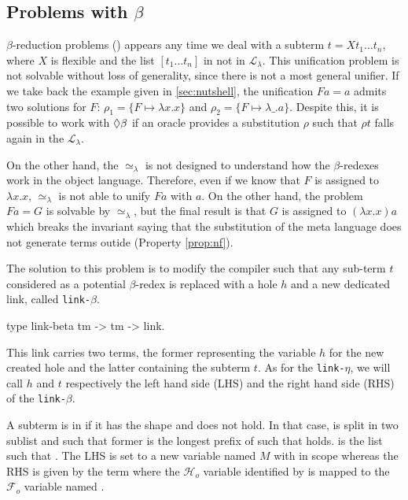 \documentclass[sigconf,natbib=false,review]{acmart}
\newcommand{\UnifRel}{\ensuremath{\simeq}}
\newcommand{\Ue}{\ensuremath{\UnifRel_\lambda}\xspace}
\newcommand{\llambda}{\ensuremath{\mathcal{L}_\lambda}\xspace}
\newcommand{\linkbeta}{\texttt{link-}\ensuremath{\beta}\xspace}
\newcommand{\linketa}{\texttt{link-}\ensuremath{\eta}\xspace}
\newcommand{\Fo}{\ensuremath{\mathcal{F}_{\!o}\xspace}} %
\newcommand{\Ho}{\ensuremath{\mathcal{H}_o}\xspace}
\begin{document}
\subsection{Problems with $\beta$}

$\beta$-reduction problems (\maybebeta) appears any time we deal with a subterm $t
= X t_1 \dots t_n$, where $X$ is flexible and the list $[t_1 \dots t_n]$ in not
in \llambda. This unification problem is not solvable without loss of
generality, since there is not a most general unifier. If we take back the
example given in \cref{sec:nutshell}, the unification $F a = a$ admits two solutions for $F$:
$\rho_1 = \{F \mapsto \lambda x.x\}$ and $\rho_2 = \{F \mapsto \lambda \_.a\}$.
Despite this, it is possible to work with $\Diamond\beta$ if an oracle provides a
substitution $\rho$ such that $\rho t$ falls again in the \llambda. 

On the other hand, the \Ue is not designed to understand how the $\beta$-redexes
work in the object language. Therefore, even if we know that $F$ is assigned
to $\lambda x.x$, \Ue is not able to unify $F a$ with $a$. On the other hand,
the problem $F a = G$ is solvable by \Ue, but the final result is that $G$ is
assigned to $(\lambda x.x) a$ which breaks the invariant saying that the 
substitution of the meta language does not generate terms outide \wellb{} (Property \ref{prop:nf}).

The solution to this problem is to modify the compiler such that any sub-term $t$
considered as a potential $\beta$-redex is replaced with a hole $h$ and a new dedicated
link, called \linkbeta.

\begin{elpicode}
  type link-beta tm -> tm -> link.
\end{elpicode}
  
This link carries two terms, the former representing the variable $h$ for the
new created hole and the latter containing the subterm $t$. As for the \linketa,
we will call $h$ and $t$ respectively the left hand side (LHS)
and the right hand side (RHS) of the \linkbeta.

A subterm is in \maybebeta{} if it has the shape  and  does not hold. In that case,  is split
in two sublist  and  such that former is the longest
prefix of  such that  holds.  is the
list such that . The LHS is set to a new variable
named $M$ with  in scope whereas the RHS is given by the term
 where the \Ho variable identified by 
is mapped to the \Fo{} variable named .
\end{document}
